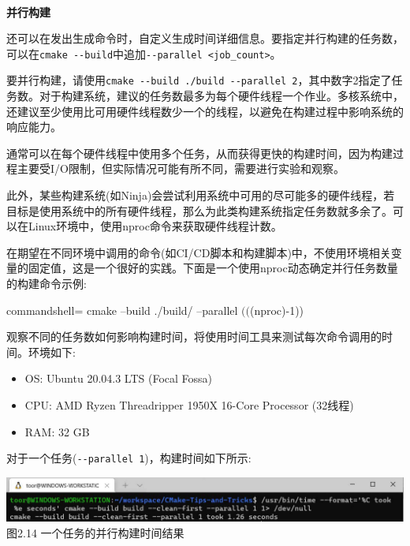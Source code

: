 \hspace*{\fill} \\ %
\noindent
\textbf{并行构建}

还可以在发出生成命令时，自定义生成时间详细信息。要指定并行构建的任务数，可以在\texttt{cmake -{}-build}中追加\texttt{-{}-parallel <job\_count>}。

要并行构建，请使用\texttt{cmake -{}-build ./build -{}-parallel 2}，其中数字2指定了任务数。对于构建系统，建议的任务数最多为每个硬件线程一个作业。多核系统中，还建议至少使用比可用硬件线程数少一个的线程，以避免在构建过程中影响系统的响应能力。

\begin{tcolorbox}[colback=webgreen!5!white,colframe=webgreen!75!black,title=Note]
通常可以在每个硬件线程中使用多个任务，从而获得更快的构建时间，因为构建过程主要受I/O限制，但实际情况可能有所不同，需要进行实验和观察。

此外，某些构建系统(如Ninja)会尝试利用系统中可用的尽可能多的硬件线程，若目标是使用系统中的所有硬件线程，那么为此类构建系统指定任务数就多余了。可以在Linux环境中，使用nproc命令来获取硬件线程计数。
\end{tcolorbox}

在期望在不同环境中调用的命令(如CI/CD脚本和构建脚本)中，不使用环境相关变量的固定值，这是一个很好的实践。下面是一个使用nproc动态确定并行任务数量的构建命令示例:

\begin{tcblisting}{commandshell={}}
cmake --build ./build/ --parallel $(($(nproc)-1))
\end{tcblisting}

观察不同的任务数如何影响构建时间，将使用时间工具来测试每次命令调用的时间。环境如下:

\begin{itemize}
\item 
OS: Ubuntu 20.04.3 LTS (Focal Fossa)

\item 
CPU: AMD Ryzen Threadripper 1950X 16-Core Processor (32线程)

\item 
RAM: 32 GB
\end{itemize}

对于一个任务(\texttt{-{}-parallel 1})，构建时间如下所示:

\begin{center}
\includegraphics[width=1.\textwidth]{content/1/chapter2/images/14.jpg}\\
图2.14 一个任务的并行构建时间结果
\end{center}

